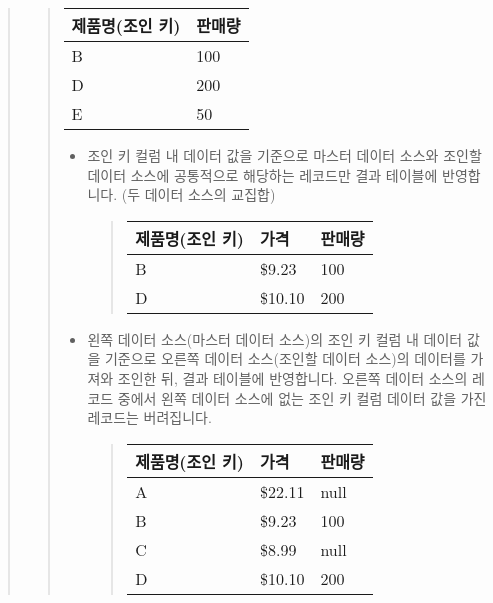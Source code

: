 \documentclass[letterpaper,10pt,english]{sphinxmanual}
\begin{document}
\begin{enumerate}
\begin{quote}
\begin{itemize}
\begin{quote}
\begin{savenotes}\sphinxattablestart
\centering
{}
\sphinxthecaptionisattop
{}\label{\detokenize{discovery/part04/create_a_dashboard:id3}}
\sphinxaftertopcaption
\begin{tabulary}{\linewidth}[t]{|T|T|}
\hline
\sphinxstyletheadfamily 
제품명(조인 키)
&\sphinxstyletheadfamily 
판매량
\\
\hline
B
&
100
\\
\hline
D
&
200
\\
\hline
E
&
50
\\
\hline
\end{tabulary}
\par
\sphinxattableend\end{savenotes}
\begin{itemize}
\item {} 
 조인 키 컬럼 내 데이터 값을 기준으로 마스터 데이터 소스와 조인할 데이터 소스에 공통적으로 해당하는 레코드만 결과 테이블에 반영합니다. (두 데이터 소스의 교집합)
\begin{quote}


\begin{savenotes}\sphinxattablestart
\centering
\begin{tabulary}{\linewidth}[t]{|T|T|T|}
\hline
\sphinxstyletheadfamily 
제품명(조인 키)
&\sphinxstyletheadfamily 
가격
&\sphinxstyletheadfamily 
판매량
\\
\hline
B
&
\$9.23
&
100
\\
\hline
D
&
\$10.10
&
200
\\
\hline
\end{tabulary}
\par
\sphinxattableend\end{savenotes}
\end{quote}

\item {} 
 왼쪽 데이터 소스(마스터 데이터 소스)의 조인 키 컬럼 내 데이터 값을 기준으로 오른쪽 데이터 소스(조인할 데이터 소스)의 데이터를 가져와 조인한 뒤, 결과 테이블에 반영합니다. 오른쪽 데이터 소스의 레코드 중에서 왼쪽 데이터 소스에 없는 조인 키 컬럼 데이터 값을 가진 레코드는 버려집니다.
\begin{quote}


\begin{savenotes}\sphinxattablestart
\centering
\begin{tabulary}{\linewidth}[t]{|T|T|T|}
\hline
\sphinxstyletheadfamily 
제품명(조인 키)
&\sphinxstyletheadfamily 
가격
&\sphinxstyletheadfamily 
판매량
\\
\hline
A
&
\$22.11
&
null
\\
\hline
B
&
\$9.23
&
100
\\
\hline
C
&
\$8.99
&
null
\\
\hline
D
&
\$10.10
&
200
\\
\hline
\end{tabulary}
\par
\sphinxattableend\end{savenotes}
\end{quote}


\end{itemize}
\end{quote}
\end{itemize}
\end{quote}
\end{enumerate}
\end{document}
